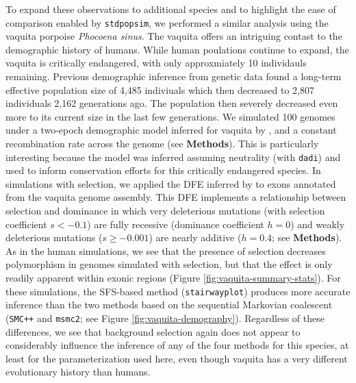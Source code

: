 \documentclass[hidelinks]{article}
\newcommand{\stdpopsim}{\texttt{stdpopsim}\xspace}
\newcommand{\msmc}{\texttt{msmc2}\xspace}
\newcommand{\stairway}{\texttt{stairwayplot}\xspace}
\newcommand{\smcpp}{\texttt{SMC++}\xspace}
\newcommand{\dadi}{\texttt{dadi}\xspace}
\begin{document}
    To expand these observations to additional species and to highlight the ease of comparison enabled by \stdpopsim,
    we performed a similar analysis using the vaquita porpoise \textit{Phocoena sinus}. 
    The vaquita offers an intriguing contast to the demographic history of humans. While human poulations continue to expand, the vaquita is critically endangered, with only approxmiately 10 individauls remaining. Previous demographic inference from genetic data \textcite{robinson2022critically} found a long-term effective population size of 4,485 indiviuals which then decreased to 2,807 individuals 2,162 generations ago. The population then severely decreased even more to its current size in the last few generations. We simulated 100 genomes under a two-epoch demographic model inferred for vaquita by \textcite{robinson2022critically},
    and a constant recombination rate across the genome (see \textbf{Methods}).
    This is particularly interesting because the model was inferred assuming neutrality (with \dadi)
    and used to inform conservation efforts for this critically endangered species.
    In simulations with selection, we applied the DFE inferred by \textcite{robinson2022critically} to exons
    annotated from the vaquita genome assembly.
    This DFE implements a relationship between selection and dominance
    in which very deleterious mutations (with selection coefficient $s<-0.1$) are fully recessive
    (dominance coefficient $h=0$) and weakly deleterious mutations ($s\geq -0.001$) are nearly
    additive ($h=0.4$; see \textbf{Methods}).
    As in the human simulations, we see that the presence of selection
    decreases polymorphism in genomes simulated with selection, but that the effect
    is only readily apparent within exonic regions (Figure \ref{fig:vaquita-summary-stats}).
    For these simulations, the SFS-based method (\stairway) produces more accurate
    inference than the two methods based on the sequential Markovian coalescent
    (\smcpp and \msmc; see Figure \ref{fig:vaquita-demography}).
    Regardless of these differences, we see that background selection again does not
    appear to considerably influence the inference of any of the four methods for this species,
    at least for the parameterization used here,
    even though vaquita has a very different evolutionary history than humans.


\end{document}
